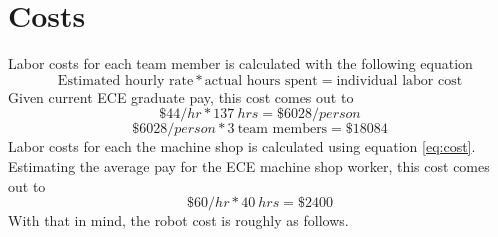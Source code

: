 \documentclass{report}
\begin{document}
    \chapter{Costs}
    Labor costs for each team member is calculated with the following equation
    \begin{equation} \label{eq:cost}
    \text{Estimated hourly rate} * \text{actual hours spent} = \text{individual labor cost}
    \end{equation}
Given current ECE graduate pay, this cost comes out to
    \[\$44/hr * 137~hrs = \$6028/person \]
    \[\$6028/person * 3~\text{team members} = \$18084 \]
Labor costs for each the machine shop is calculated using equation \ref{eq:cost}. Estimating the average pay for the ECE machine shop worker, this cost comes out to
    \[\$60/hr * 40~hrs = \$2400 \]
With that in mind, the robot cost is roughly as follows.
\end{document}
